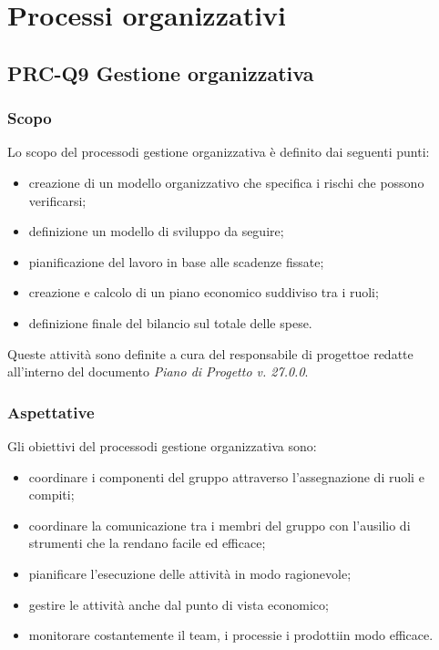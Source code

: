 \section{Processi organizzativi}
	\subsection{PRC-Q9 Gestione organizzativa}
		\subsubsection{Scopo}
			Lo scopo del processo\glosp di gestione organizzativa è definito dai seguenti punti:
			\begin{itemize}
				\item creazione di un modello organizzativo che specifica i rischi che possono verificarsi;
				\item definizione un modello di sviluppo da seguire;
				\item pianificazione del lavoro in base alle scadenze fissate;
				\item creazione e calcolo di un piano economico suddiviso tra i ruoli;
				\item definizione finale del bilancio sul totale delle spese.
			\end{itemize}
			Queste attività sono definite a cura del responsabile di progetto\glosp e redatte all'interno del documento \textit{Piano di Progetto v. 27.0.0}.
		\subsubsection{Aspettative}
			Gli obiettivi del processo\glosp di gestione organizzativa sono:
			\begin{itemize}
				\item coordinare i componenti del gruppo attraverso l'assegnazione di ruoli e compiti;
				\item coordinare la comunicazione tra i membri del gruppo con l'ausilio di strumenti che la rendano facile ed efficace;
				\item pianificare l'esecuzione delle attività in modo ragionevole;
				\item gestire le attività anche dal punto di vista economico;
				\item monitorare costantemente il team, i processi\glosp e i prodotti\glosp in modo efficace.
			\end{itemize}
